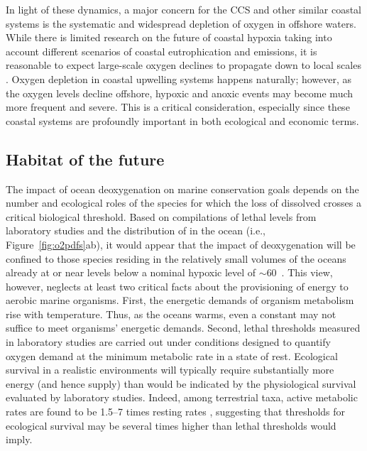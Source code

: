 \documentclass{report_chapter}
\begin{document}
In light of these dynamics, a major concern for the CCS and other similar coastal systems is the systematic and widespread depletion of oxygen in offshore waters.
While there is limited research on the future of coastal hypoxia taking into account different scenarios of coastal eutrophication and emissions, it is reasonable to expect large-scale oxygen declines to propagate down to local scales \citep{Bianucci-Fennel-etal-2015}.
Oxygen depletion in coastal upwelling systems happens naturally; however, as the oxygen levels decline offshore, hypoxic and anoxic events may become much more frequent and severe.
This is a critical consideration, especially since these coastal systems are profoundly important in both ecological and economic terms.


\subsection{Habitat of the future}\label{loc:MI}

The impact of ocean deoxygenation on marine conservation goals depends on the number and ecological roles of the species for which the loss of dissolved \OO{} crosses a critical biological threshold.
Based on compilations of lethal \OO{} levels from laboratory studies and the distribution of \OO{} in the ocean (i.e., Figure~\ref{fig:o2pdfs}ab), it would appear that the impact of deoxygenation will be confined to those species residing in the relatively small volumes of the oceans already at or near \OO{} levels below a nominal hypoxic level of $\sim$60~\mmolmmm{}.
This view, however, neglects at least two critical facts about the provisioning of energy to aerobic marine organisms.
First, the energetic demands of organism metabolism rise with temperature.   Thus, as the oceans warms, even a constant \OO{} may not suffice to meet organisms' energetic demands.
Second, lethal thresholds measured in laboratory studies are carried out under conditions designed to quantify oxygen demand at the minimum metabolic rate in a state of rest.
Ecological survival in a realistic environments will typically require substantially more energy (and hence \OO{} supply) than would be indicated by the physiological survival evaluated by laboratory studies.
Indeed, among terrestrial taxa, active metabolic rates are found to be 1.5--7 times resting rates \citep{Peterson-Nagy-etal-1990}, suggesting that \OO{} thresholds for ecological survival may be several times higher than lethal thresholds would imply.
\end{document}
